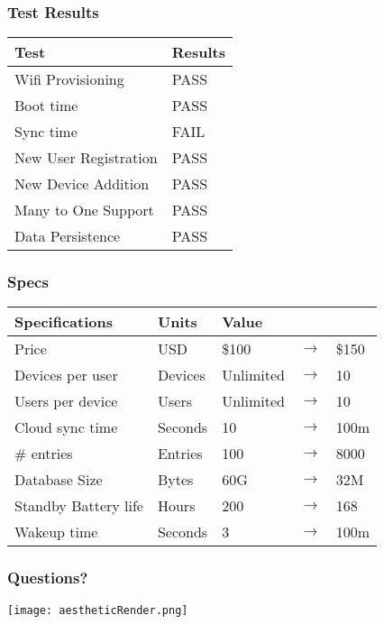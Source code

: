 \documentclass{beamer}
\begin{document}
\begin{frame}
  \frametitle{Test Results}
    \centering
    \begin{tabular}{l
    >{\columncolor[HTML]{9AFF99}}l }
    \hline
    Test                  & \cellcolor[HTML]{FFFFFF}Results \\
    \hline
    Wifi Provisioning     & PASS                         \\
    Boot time             & PASS                         \\
    Sync time             & \cellcolor[HTML]{FFCCC9}FAIL \\
    New User Registration & PASS                         \\
    New Device Addition   & PASS                         \\
    Many to One Support   & PASS                         \\
    Data Persistence      & PASS                         \\
    \hline
    \end{tabular}
\end{frame}

\begin{frame}
  \frametitle{Specs}
  \begin{table}
    \centering
    \begin{tabular}{lllll}
      \hline
      Specifications                & Units   & \multicolumn{3}{l}{Value} \\
      \hline
      Price                & USD     & \$100     & $\rightarrow$ & \$150 \\
      Devices per user     & Devices & Unlimited & $\rightarrow$ & 10    \\
      Users per device     & Users   & Unlimited & $\rightarrow$ & 10    \\
      Cloud sync time      & Seconds & 10        & $\rightarrow$ & 100m  \\
      \# entries           & Entries & 100       & $\rightarrow$ & 8000  \\
      Database Size        & Bytes   & 60G       & $\rightarrow$ & 32M   \\
      Standby Battery life & Hours   & 200       & $\rightarrow$ & 168    \\
      Wakeup time          & Seconds & 3         & $\rightarrow$ & 100m  \\
      \hline
    \end{tabular}
  \end{table}
\end{frame}

\begin{frame}
  \frametitle{Questions?}
    \centering
    \texttt{[image: aestheticRender.png]}
\end{frame}
\end{document}
